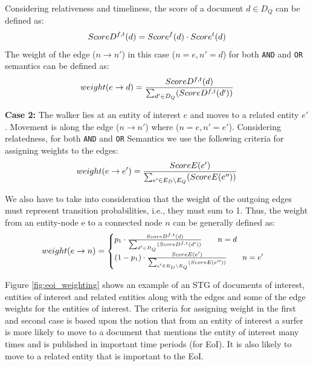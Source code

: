 \documentclass{article}
\begin{document}
Considering relativeness and timeliness, the score of a document $d \in D_Q$ can be defined as: 
\begin{equation}
\begin{split}
\small
ScoreD^{f,t}(d) = Score^{f}(d) \cdot Score^{t}(d) 
\end{split}
\end{equation}
The weight of the edge ($n \rightarrow n'$) in this case ($n=e, n'=d$) for 
both {\tt AND} and {\tt OR} semantics can be defined as:
\begin{equation}
\begin{split}
\small
weight(e \rightarrow d) = \frac{ScoreD^{f,t}(d)}{\sum_{d' \in D_Q}(ScoreD^{f,t}(d'))}  
\end{split}
\end{equation}

\vspace{2mm}\noindent
{\bf Case 2:} The walker lies at an entity of interest $e$ and moves to 
a related entity $e'$. Movement is along the edge ($n \rightarrow n'$) where 
($n=e, n'=e'$). Considering relatedness, for both {\tt AND} and {\tt OR} Semantics
we use the following criteria for assigning weights to the edges: 
\begin{equation}
\begin{split}
\small
weight(e \rightarrow e') = \frac{ScoreE(e')}{\sum_{e' \in E_D \setminus E_Q}(ScoreE(e''))}  
\end{split}
\end{equation}

We also have to take into consideration that the weight of the outgoing edges 
must represent transition probabilities, i.e., they must sum to 1. 
Thus, the weight from an entity-node e to a connected node $n$ can be 
generally defined as:
\begin{gather}
\small
weight(e \rightarrow n) = \begin{cases}
    p_1 \cdot \frac{ScoreD^{f,t}(d)}{\sum_{d' \in D_Q}(ScoreD^{f,t}(d'))} \qquad 
    n = d\\
    (1-p_1) \cdot \frac{ScoreE(e')}{\sum_{e' \in E_D \setminus E_Q}(ScoreE(e''))} 
    \qquad n = e'
\end{cases}
\end{gather}
 

\vspace{2mm}\noindent
Figure \ref{fig:eoi_weighting} shows an example of an STG of documents of interest, 
entities of interest and related entities along with the edges and some of the edge 
weights for the entities of interest. 
The criteria for assigning weight in the first and second case is based upon the 
notion that from an entity of interest a surfer is more likely to move to a document
that mentions the entity of interest many times and is published in important 
time periods (for EoI). It is also likely to move to a related entity that is important
to the EoI.
\end{document}
